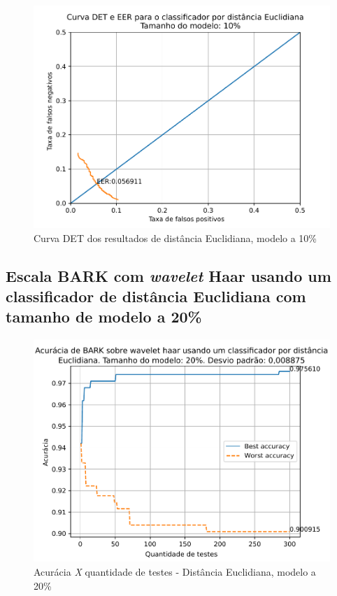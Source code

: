 			\begin{figure}[!h]
				\centering
				\includegraphics[width=.6\linewidth]{images/results/det/DET_for_classifier_Euclidian_10}
				\caption{Curva DET dos resultados de distância Euclidiana, modelo a 10\%}
				\label{fig:detforclassifiereuclidian10}
			\end{figure}

			\FloatBarrier
					
		\subsection{Escala BARK com \textit{wavelet} Haar usando um classificador de distância Euclidiana com tamanho de modelo a 20\%}
			
			
			\begin{figure}[ht]
				\centering
				\includegraphics[width=.6\linewidth]{images/results/confusionMatrices/classifier_Euclidian_20}
				\caption{Acurácia \textit{X} quantidade de testes - Distância Euclidiana, modelo a 20\%}
				\label{fig:classifiereuclidian20}
			\end{figure}
		
